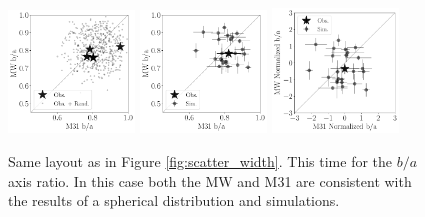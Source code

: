 \documentclass[a4paper,fleqn,usenatbib]{mnras}
\begin{document}
\begin{figure}
\centering
\includegraphics[width=0.30\textwidth]{scatter_random_ranked_ba_ratio.pdf}
\includegraphics[width=0.30\textwidth]{scatter_ranked_illudm_ba_ratio.pdf}
\includegraphics[width=0.30\textwidth]{scatter_norm_ranked_illudm_ba_ratio.pdf}
\caption{Same layout as in Figure \ref{fig:scatter_width}. 
This time for the $b/a$ axis ratio. In this case both the MW and M31
are consistent with the results of a spherical distribution and 
simulations. 
\label{fig:scatter_ba_ratio}}
\end{figure}
\end{document}
